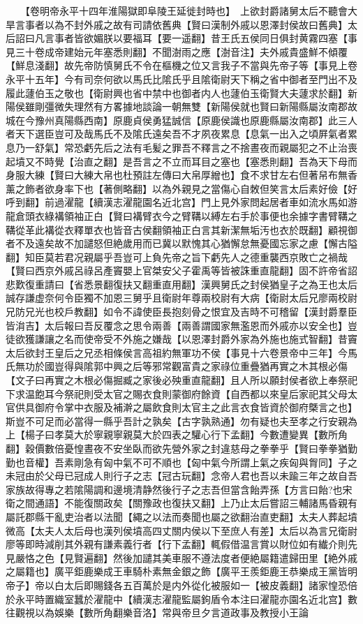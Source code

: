 　　【卷明帝永平十四年淮陽獄即阜陵王延徙封時也】　上欲封爵諸舅太后不聽會大旱言事者以為不封外戚之故有司請依舊典【賢曰漢制外戚以恩澤封侯故曰舊典】太后詔曰凡言事者皆欲媚朕以要福耳【要一遥翻】昔王氏五侯同日俱封黄霧四塞【事見三十卷成帝建始元年塞悉則翻】不聞澍雨之應【澍音注】夫外戚貴盛鮮不傾覆【鮮息淺翻】故先帝防慎舅氏不令在樞機之位又言我子不當與先帝子等【事見上卷永平十五年】今有司奈何欲以馬氏比隂氏乎且隂衛尉天下稱之省中御者至門出不及履此蘧伯玉之敬也【衛尉興也省中禁中也御者内人也蘧伯玉衛賢大夫蘧求於翻】新陽侯雖剛彊微失理然有方畧據地談論一朝無雙【新陽侯就也賢曰新陽縣屬汝南郡故城在今豫州真陽縣西南】原鹿貞侯勇猛誠信【原鹿侯識也原鹿縣屬汝南郡】此三人者天下選臣豈可及哉馬氏不及隂氏遠矣吾不才夙夜累息【息氣一出入之頃屛氣者累息乃一舒氣】常恐虧先后之法有毛髪之罪吾不釋言之不捨晝夜而親屬犯之不止治喪起墳又不時覺【治直之翻】是吾言之不立而耳目之塞也【塞悉則翻】吾為天下母而身服大練【賢曰大練大帛也杜預註左傳曰大帛厚繒也】食不求甘左右但著帠布無香薰之飾者欲身率下也【著側略翻】以為外親見之當傷心自敇但笑言太后素好儉【好呼到翻】前過濯龍【續漢志濯龍園名近北宫】門上見外家問起居者車如流水馬如游龍倉頭衣綠褠領袖正白【賢曰褠臂衣今之臂鞲以縛左右手於事便也余據字書臂鞲之鞲從革此褠從衣釋單衣也皆音古侯翻領袖正白言其新潔無垢汚也衣於既翻】顧視御者不及遠矣故不加譴怒但絶歲用而已冀以默愧其心猶懈怠無憂國忘家之慮【懈古隘翻】知臣莫若君况親屬乎吾豈可上負先帝之旨下虧先人之德重襲西京敗亡之禍哉【賢曰西京外戚呂祿呂產竇嬰上官桀安父子霍禹等皆被誅重直龍翻】固不許帝省詔悲歎復重請曰【省悉景翻復扶又翻重直用翻】漢興舅氏之封侯猶皇子之為王也太后誠存謙虚奈何令臣獨不加恩三舅乎且衛尉年尊兩校尉有大病【衛尉太后兄廖兩校尉兄防兄光也校戶教翻】如令不諱使臣長抱刻骨之恨宜及吉時不可稽留【漢封爵羣臣皆㳙吉】太后報曰吾反覆念之思令兩善【兩善謂國家無濫恩而外戚亦以安全也】豈徒欲獲謙讓之名而使帝受不外施之嫌哉【以恩澤封爵外家為外施也施式智翻】昔竇太后欲封王皇后之兄丞相條侯言高祖約無軍功不侯【事見十六卷景帝中三年】今馬氏無功於國豈得與隂郭中興之后等邪常觀富貴之家祿位重疊猶再實之木其根必傷【文子曰再實之木根必傷掘臧之家後必殃重直龍翻】且人所以願封侯者欲上奉祭祀下求温飽耳今祭祀則受太官之賜衣食則蒙御府餘資【自西都以來皇后家祀其父母太官供具御府令掌中衣服及補澣之屬飲食則太官主之此言衣食皆資於御府槩言之也】斯豈不可足而必當得一縣乎吾計之孰矣【古字孰熟通】勿有疑也夫至孝之行安親為上【楊子曰孝莫大於寧親寧親莫大於四表之驩心行下孟翻】今數遭變異【數所角翻】穀價數倍憂惶晝夜不安坐臥而欲先營外家之封違慈母之拳拳乎【賢曰拳拳猶勤勤也音權】吾素剛急有匈中氣不可不順也【匈中氣今所謂上氣之疾匈與胷同】子之未冠由於父母已冠成人則行子之志【冠古玩翻】念帝人君也吾以未踰三年之故自吾家族故得專之若隂陽調和邊境清静然後行子之志吾但當含飴弄孫【方言曰飴?也宋衛之間通語】不能復關政矣【關豫政也復扶又翻】上乃止太后嘗詔三輔諸馬昏親有屬託郡縣干亂吏治者以法聞【繩之以法而奏聞也屬之欲翻治直吏翻】太夫人葬起墳微高【太夫人太后母也漢列侯墳高四丈關内侯以下至庶人有差】太后以為言兄衛尉廖等即時減削其外親有謙素義行者【行下孟翻】輒假借温言賞以財位如有纎介則先見嚴恪之色【見賢遍翻】然後加譴其美車服不遵法度者便絶屬籍遣歸田里【絶外戚之屬籍也】廣平鉅鹿樂成王車騎朴素無金銀之飾【廣平王羨鉅鹿王恭樂成王黨皆明帝子】帝以白太后即賜錢各五百萬於是内外從化被服如一【被皮義翻】諸家惶恐倍於永平時置織室蠶於濯龍中【續漢志濯龍監屬鉤盾令本注曰濯龍亦園名近北宫】數往觀視以為娛樂【數所角翻樂音洛】常與帝旦夕言道政事及教授小王論